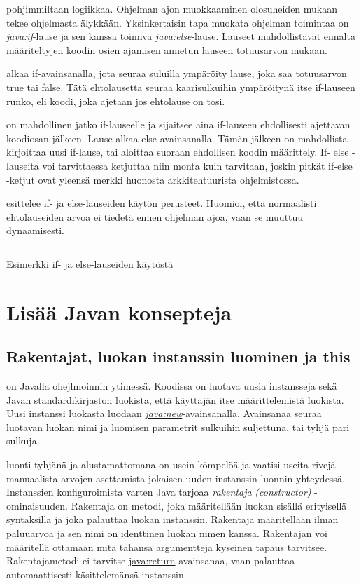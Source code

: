 \documentclass{tufte-book}
\newcommand{\eng}[1]{\textit{(#1)}}
\newcommand{\new}[1]{\textit{\gls{#1}}}
\newcommand{\neweng}[2]{\new{#1} \eng{#2}}
\newcommand{\java}[1]{\underline{\gls{java:#1}}}
\newcommand{\newjava}[1]{\textit{\java{#1}}}
\newcommand{\code}[3]{
\begin{listing}
    \inputminted{java}{OhjelmointiopasEsimerkit/src/#1/#2.java}
    \caption{#3}
    \label{Java-#1-#2}
\end{listing}
}
\begin{document}
 pohjimmiltaan logiikkaa. Ohjelman ajon muokkaaminen olosuheiden
mukaan tekee ohjelmasta älykkään. Yksinkertaisin tapa muokata ohjelman toimintaa on
\newjava{if}-lause ja sen kanssa toimiva \newjava{else}-lause. Lauseet mahdollistavat ennalta
määriteltyjen koodin osien ajamisen annetun lauseen totuusarvon mukaan.

 alkaa if-avainsanalla, jota seuraa suluilla ympäröity lause, joka saa
totuusarvon true tai false. Tätä ehtolausetta seuraa kaarisulkuihin ympäröitynä itse if-lauseen
runko, eli koodi, joka ajetaan jos ehtolause on tosi.

 on mahdollinen jatko if-lauseelle ja sijaitsee aina if-lauseen
ehdollisesti ajettavan koodiosan jälkeen. Lause alkaa else-avainsanalla. Tämän jälkeen on
mahdollista kirjoittaa uusi if-lause, tai aloittaa suoraan ehdollisen koodin määrittely. If-
else -lauseita voi tarvittaessa ketjuttaa niin monta kuin tarvitaan, joskin pitkät if-else
-ketjut ovat yleensä merkki huonosta arkkitehtuurista ohjelmistossa.

 esittelee if- ja else-lauseiden käytön perusteet. Huomioi,
että normaalisti ehtolauseiden arvoa ei tiedetä ennen ohjelman ajoa, vaan se muuttuu dynaamisesti.

\code{week2/basicexamples}{IfElse}{Esimerkki if- ja else-lauseiden käytöstä}


\section{Lisää Javan konsepteja}
\label{ohjelman perusteista2}

\subsection{Rakentajat, luokan instanssin luominen ja this}
\label{new this}

 on Javalla ohejlmoinnin ytimessä. Koodissa on luotava uusia
instansseja sekä Javan standardikirjaston luokista, että käyttäjän itse määrittelemistä luokista.
Uusi instanssi luokasta luodaan \newjava{new}-avainsanalla. Avainsanaa seuraa luotavan luokan
nimi ja luomisen parametrit sulkuihin suljettuna, tai tyhjä pari sulkuja.

 luonti tyhjänä ja alustamattomana on usein kömpelöä ja vaatisi
useita rivejä manuaalista arvojen asettamista jokaisen uuden instanssin luonnin yhteydessä.
Instanssien konfiguroimista varten Java tarjoaa \neweng{rakentaja}{constructor} -ominaisuuden.
Rakentaja on metodi, joka määritellään luokan sisällä erityisellä syntaksilla ja joka palauttaa
luokan instanssin. Rakentaja määritellään ilman paluuarvoa ja sen nimi on identtinen luokan nimen
kanssa. Rakentajan voi määritellä ottamaan mitä tahansa argumentteja kyseinen tapaus tarvitsee.
Rakentajametodi ei tarvitse \java{return}-avainsanaa, vaan palauttaa automaattisesti
käsittelemänsä instanssin.
\end{document}
